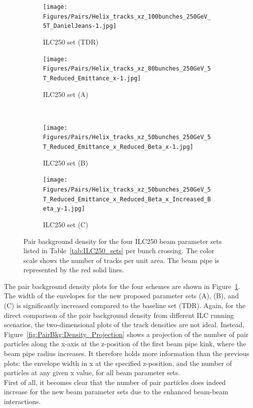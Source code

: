 \begin{figure}
\centering
\begin{subfigure}[t]{0.49\textwidth}
\centering
\texttt{[image: Figures/Pairs/Helix\_tracks\_xz\_100bunches\_250GeV\_5T\_DanielJeans-1.jpg]}
\caption{ILC250 set (TDR)}
\end{subfigure}
\hspace*{0.08cm}
\begin{subfigure}[t]{0.49\textwidth}
\centering
\texttt{[image: Figures/Pairs/Helix\_tracks\_xz\_80bunches\_250GeV\_5T\_Reduced\_Emittance\_x-1.jpg]}
\caption{ILC250 set (A)}
\end{subfigure}
\\
\begin{subfigure}[t]{0.49\textwidth}
\centering
\texttt{[image: Figures/Pairs/Helix\_tracks\_xz\_50bunches\_250GeV\_5T\_Reduced\_Emittance\_x\_Reduced\_Beta\_x-1.jpg]}
\caption{ILC250 set (B)}
\end{subfigure}
\hspace*{0.08cm}
\begin{subfigure}[t]{0.49\textwidth}
\centering
\texttt{[image: Figures/Pairs/Helix\_tracks\_xz\_50bunches\_250GeV\_5T\_Reduced\_Emittance\_x\_Reduced\_Beta\_x\_Increased\_Beta\_y-1.jpg]}
\caption{ILC250 set (C)}
\end{subfigure}
\caption[Pair background density for the proposed ILC250 beam parameter sets]{Pair background density for the four ILC250 beam parameter sets listed in Table~\ref{tab:ILC250_sets} per bunch crossing. 
The color scale shows the number of tracks per unit area.
The beam pipe is represented by the red solid lines.}
\label{fig:PairBkg:ILC250_Envelopes}
\end{figure}
The pair background density plots for the four schemes are shown in Figure~\ref{fig:PairBkg:ILC250_Envelopes}.
The width of the envelopes for the new proposed parameter sets (A), (B), and (C) is significantly increased compared to the baseline set (TDR).
Again, for the direct comparison of the pair background density from different ILC running scenarios, the two-dimensional plots of the track densities are not ideal.
Instead, Figure~\ref{fig:PairBkg:Density_Projection} shows a projection of the number of pair particles along the x-axis at the z-position of the first beam pipe kink, where the beam pipe radius increases.
It therefore holds more information than the previous plots: the envelope width in x at the specified z-position, and the number of particles at any given x value, for all beam parameter sets.
\\First of all, it becomes clear that the number of pair particles does indeed increase for the new beam parameter sets due to the enhanced beam-beam interactions.
